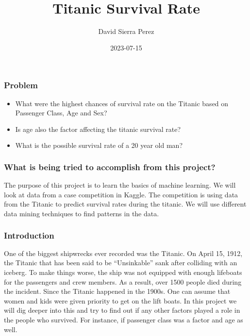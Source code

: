 \documentclass[
]{article}
\title{Titanic Survival Rate}
\author{David Sierra Perez}
\date{2023-07-15}
\providecommand{\tightlist}{%
  \setlength{\itemsep}{0pt}\setlength{\parskip}{0pt}}
\begin{document}
\maketitle

\hypertarget{problem}{%
\subsubsection{\texorpdfstring{\textbf{Problem}}{Problem}}\label{problem}}

\begin{itemize}
\tightlist
\item
  What were the highest chances of survival rate on the Titanic based on
  Passenger Class, Age and Sex?
\item
  Is age also the factor affecting the titanic survival rate?
\item
  What is the possible survival rate of a 20 year old man?
\end{itemize}

\hypertarget{what-is-being-tried-to-accomplish-from-this-project}{%
\subsubsection{\texorpdfstring{\textbf{What is being tried to accomplish
from this
project?}}{What is being tried to accomplish from this project?}}\label{what-is-being-tried-to-accomplish-from-this-project}}

The purpose of this project is to learn the basics of machine learning.
We will look at data from a case competition in Kaggle. The competition
is using data from the Titanic to predict survival rates during the
titanic. We will use different data mining techniques to find patterns
in the data.

\hypertarget{introduction}{%
\subsubsection{\texorpdfstring{\textbf{Introduction}}{Introduction}}\label{introduction}}

One of the biggest shipwrecks ever recorded was the Titanic. On April
15, 1912, the Titanic that has been said to be ``Unsinkable'' sank after
colliding with an iceberg. To make things worse, the ship was not
equipped with enough lifeboats for the passengers and crew members. As a
result, over 1500 people died during the incident. Since the Titanic
happened in the 1900s. One can assume that women and kids were given
priority to get on the lift boats. In this project we will dig deeper
into this and try to find out if any other factors played a role in the
people who survived. For instance, if passenger class was a factor and
age as well.
\end{document}
